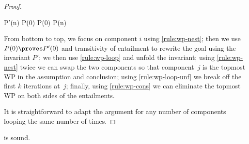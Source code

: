 \documentclass[acmsmall,nonacm,screen,appendix]{acmart}
\begin{document}
\begin{proof}
\begin{derivation}
{{{{        P'(n)
      }
    }}{
      P(0) \proves
    }}{
      P(0) \proves
       {P(n)}
    }
  \end{derivation}
  From bottom to top,
    we focus on component $i$ using \ref{rule:wp-nest};
    then we use $P(0) \proves P'(0)$ and transitivity of entailment
    to rewrite the goal using the invariant $P'$;
    we then use \ref{rule:wp-loop} and unfold the invariant;
    using \ref{rule:wp-nest} twice we can swap the two components so that
    component~$j$ is the topmost WP in the assumption and conclusion;
    using \ref{rule:wp-loop-unf} we break off the first $k$ iterations at~$j$;
    finally, using \ref{rule:wp-cons} we can eliminate the topmost
    WP on both sides of the entailments.

  It is straightforward to adapt the argument for any number of components
  looping the same number of times.
\end{proof} \begin{lemma}
\label{proof:wp-rl-assign}
   is sound.
\end{lemma}
\end{document}
